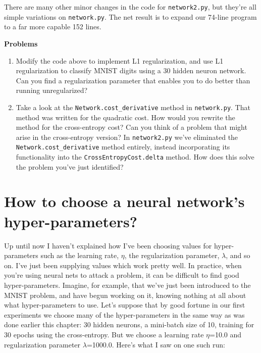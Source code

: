 There are many other minor changes in the code for \lstinline{network2.py}, but they're all simple variations on \lstinline{network.py}. The net result is to expand our 74-line program to a far more capable 152 lines.


\textbf{Problems}



\begin{enumerate}
\item Modify the code above to implement L1 regularization, and use L1 regularization to classify MNIST digits using a 30 hidden neuron network. Can you find a regularization parameter that enables you to do better than running unregularized?
\item Take a look at the \lstinline{Network.cost_derivative} method in \lstinline{network.py}. That method was written for the quadratic cost. How would you rewrite the method for the cross-entropy cost? Can you think of a problem that might arise in the cross-entropy version? In \lstinline{network2.py} we've eliminated the \lstinline{Network.cost_derivative} method entirely, instead incorporating its functionality into the \lstinline{CrossEntropyCost.delta} method. How does this solve the problem you've just identified?
\end{enumerate}

\section{How to choose a neural network's hyper-parameters?}

Up until now I haven't explained how I've been choosing values for hyper-parameters such as the learning rate, $\eta$, the regularization parameter, $\lambda$, and so on. I've just been supplying values which work pretty well. In practice, when you're using neural nets to attack a problem, it can be difficult to find good hyper-parameters. Imagine, for example, that we've just been introduced to the MNIST problem, and have begun working on it, knowing nothing at all about what hyper-parameters to use. Let's suppose that by good fortune in our first experiments we choose many of the hyper-parameters in the same way as was done earlier this chapter: 30 hidden neurons, a mini-batch size of 10, training for 30 epochs using the cross-entropy. But we choose a learning rate $\eta$=10.0 and regularization parameter $\lambda$=1000.0. Here's what I saw on one such run:


